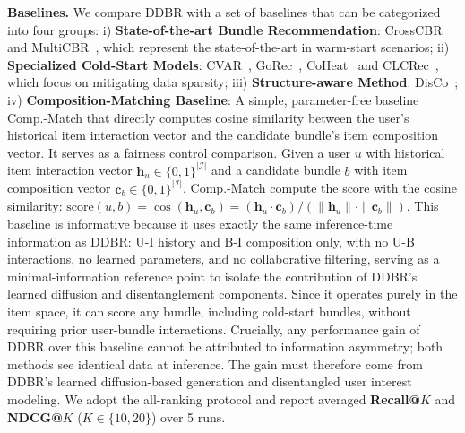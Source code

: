 \documentclass[lettersize,journal]{IEEEtran}
\newcommand{\revise}[1]{\textcolor{blue}{#1}}
\begin{document}
\noindent\textbf{Baselines.}
We compare DDBR with a set of baselines that can be categorized into four groups:
i) \textbf{State-of-the-art Bundle Recommendation}: CrossCBR~\cite{ma2022crosscbr} and MultiCBR~\cite{ma2024multicbr}, which represent the state-of-the-art in warm-start scenarios;
ii) \textbf{Specialized Cold-Start Models}: CVAR~\revise{\cite{zhao2022cvae}}, GoRec~\cite{bai2023gorec}, CoHeat~\cite{jeon2024cold} and CLCRec~\cite{wei2021contrastive}, which focus on mitigating data sparsity;
iii) \textbf{Structure-aware Method}: DisCo~\cite{bui2025personalized};
iv) \textbf{Composition-Matching Baseline}: A simple, parameter-free baseline Comp.-Match that directly computes cosine similarity between the user's historical item interaction vector and the candidate bundle's item composition vector. It serves as a fairness control comparison. Given a user $u$ with historical item interaction vector $\mathbf{h}_u \in \{0,1\}^{|\mathcal{I}|}$ and a candidate bundle $b$ with item composition vector $\mathbf{c}_b \in \{0,1\}^{|\mathcal{I}|}$, Comp.-Match compute the score with the cosine similarity: $\text{score}(u, b) = \cos(\mathbf{h}_u, \mathbf{c}_b) = (\mathbf{h}_u \cdot \mathbf{c}_b) / (\|\mathbf{h}_u\| \cdot \|\mathbf{c}_b\|)$. This baseline is informative because it uses exactly the same inference-time information as DDBR: U-I history and B-I composition only, with no U-B interactions, no learned parameters, and no collaborative filtering, serving as a minimal-information reference point to isolate the contribution of DDBR's learned diffusion and disentanglement components. Since it operates purely in the item space, it can score any bundle, including cold-start bundles, without requiring prior user-bundle interactions. Crucially, any performance gain of DDBR over this baseline cannot be attributed to information asymmetry; both methods see identical data at inference. The gain must therefore come from DDBR's learned diffusion-based generation and disentangled user interest modeling.
We adopt the all-ranking protocol and report averaged \textbf{Recall@$K$} and \textbf{NDCG@$K$} ($K \in \{10, 20\}$) over 5 runs.
\end{document}
